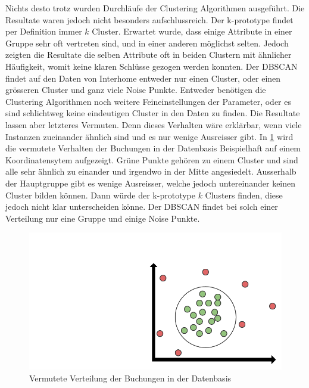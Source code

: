 Nichts desto trotz wurden Durchläufe der Clustering Algorithmen ausgeführt. Die Resultate waren jedoch nicht besonders aufschlussreich. Der k-prototype findet per Definition immer $k$ Cluster. Erwartet wurde, dass einige Attribute in einer Gruppe sehr oft vertreten sind, und in einer anderen möglichst selten. Jedoch zeigten die Resultate die selben Attribute oft in beiden Clustern mit ähnlicher Häufigkeit, womit keine klaren Schlüsse gezogen werden konnten. Der DBSCAN findet auf den Daten von Interhome entweder nur einen Cluster, oder einen grösseren Cluster und ganz viele Noise Punkte. Entweder benötigen die Clustering Algorithmen noch weitere Feineinstellungen der Parameter, oder es sind schlichtweg keine eindeutigen Cluster in den Daten zu finden. Die Resultate lassen aber letzteres Vermuten. Denn dieses Verhalten wäre erklärbar, wenn viele Instanzen zueinander ähnlich sind und es nur wenige Ausreisser gibt. In \cref{fig:proofofconcept:fazit:2} wird die vermutete Verhalten der Buchungen in der Datenbasis Beispielhaft auf einem Koordinatensytem aufgezeigt. Grüne Punkte gehören zu einem Cluster und sind alle sehr ähnlich zu einander und irgendwo in der Mitte angesiedelt. Ausserhalb der Hauptgruppe gibt es wenige Ausreisser, welche jedoch untereinander keinen Cluster bilden können. Dann würde der k-prototype $k$ Clusters finden, diese jedoch nicht klar unterscheiden könne. Der DBSCAN findet bei solch einer Verteilung nur eine Gruppe und einige Noise Punkte.

\begin{figure}[H]
	\RawFloats
	\centering
	\includegraphics[width=1\textwidth]{images/expected-data-distribution}
	\caption{Vermutete Verteilung der Buchungen in der Datenbasis}
	\label{fig:proofofconcept:fazit:2}
\end{figure}

